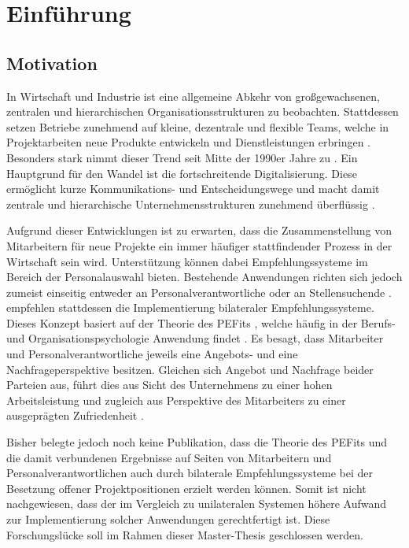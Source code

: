 \chapter{Einführung}
\label{ch:intro}

\section{Motivation}
\label{sec:intro:motivation}
In Wirtschaft und Industrie ist eine allgemeine Abkehr von großgewachsenen, zentralen und hierarchischen Organisationsstrukturen zu beobachten. Stattdessen setzen Betriebe zunehmend auf kleine, dezentrale und flexible Teams, welche in Projektarbeiten neue Produkte entwickeln und Dienstleistungen erbringen \cite[S. 2f.]{elanceEconomy:1999}. Besonders stark nimmt dieser Trend seit Mitte der 1990er Jahre zu \cite[S. 8]{whittington:1999}. Ein Hauptgrund für den Wandel ist die fortschreitende Digitalisierung. Diese ermöglicht kurze Kommunikations- und Entscheidungswege und macht damit zentrale und hierarchische Unternehmensstrukturen zunehmend überflüssig \cite[S. 5]{elanceEconomy:1999}.

Aufgrund dieser Entwicklungen ist zu erwarten, dass die Zusammenstellung von Mitarbeitern für neue Projekte ein immer häufiger stattfindender Prozess in der Wirtschaft sein wird. Unterstützung können dabei Empfehlungssysteme im Bereich der Personalauswahl bieten. Bestehende Anwendungen richten sich jedoch zumeist einseitig entweder an Personalverantwortliche oder an Stellensuchende \cite[S. 2f.]{siting:2012}. \textcite[S. 1ff.]{malinowski:2006} empfehlen stattdessen die Implementierung bilateraler Empfehlungssysteme. Dieses Konzept basiert auf der Theorie des \aclp{PEFit} \cite[S. 3.f]{malinowski:2006}, welche häufig in der Berufs- und Organisationspsychologie Anwendung findet \cite[S. 2]{guan:2021}. Es besagt, dass Mitarbeiter und Personalverantwortliche jeweils eine Angebots- und eine Nachfrageperspektive besitzen. Gleichen sich Angebot und Nachfrage beider Parteien aus, führt dies aus Sicht des Unternehmens zu einer hohen Arbeitsleistung und zugleich aus Perspektive des Mitarbeiters zu einer ausgeprägten Zufriedenheit \cite[S. 6]{su:2015}.

Bisher belegte jedoch noch keine Publikation, dass die Theorie des \aclp{PEFit} und die damit verbundenen Ergebnisse auf Seiten von Mitarbeitern und Personalverantwortlichen auch durch bilaterale Empfehlungssysteme bei der Besetzung offener Projektpositionen erzielt werden können. Somit ist nicht nachgewiesen, dass der im Vergleich zu unilateralen Systemen höhere Aufwand zur Implementierung solcher Anwendungen gerechtfertigt ist. Diese Forschungslücke soll im Rahmen dieser Master-Thesis geschlossen werden.

